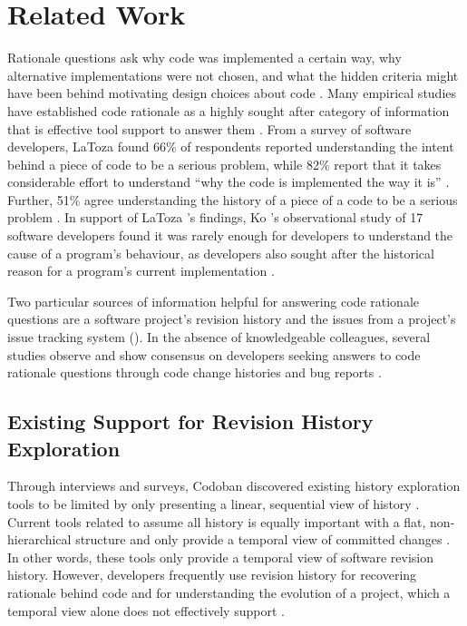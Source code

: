 \chapter{Related Work}
\label{ch:Related-Work}

Rationale questions ask why code was implemented a certain way, why alternative implementations were not chosen, and what the hidden criteria might have been behind motivating design choices about code \cite{latoza_hard-answer_2010}.
Many empirical studies have established code rationale as a highly sought after category of information that is effective tool support to answer them \cite{latoza_maintaining_2006, latoza_hard-answer_2010, ko_information_2007}. 
From a survey of software developers, LaToza \etal found 66\% of respondents reported understanding the intent behind a piece of code to be a serious problem, 
while 82\% report that it takes considerable effort to understand ``why the code is implemented the way it is'' \cite{latoza_maintaining_2006}.
Further, 51\% agree understanding the history of a piece of a code to be a serious problem \cite{latoza_maintaining_2006}.
In support of LaToza \etal's findings, Ko \etal's observational study of 17 software developers found it was rarely enough for developers to understand the cause of a program's behaviour, as developers also sought after the historical reason for a program's current implementation \cite{ko_information_2007}.

Two particular sources of information helpful for answering code rationale questions are a software project's revision history and the issues from a project's issue tracking system (). 
In the absence of knowledgeable colleagues, several studies observe and show consensus on developers seeking answers to code rationale questions through code change histories and bug reports \cite{ko_information_2007, codoban_software_2015, robillard_turnover-induced_2021}.

\section{Existing Support for Revision History Exploration}

Through interviews and surveys, Codoban \etal discovered existing history exploration tools to be limited by only presenting a linear, sequential view of history \cite{codoban_software_2015}.
Current tools related to  assume all history is equally important with a flat, non-hierarchical structure and only provide a temporal view of committed changes \cite{codoban_software_2015}.
In other words, these tools only provide a temporal view of software revision history.
However, developers frequently use revision history for recovering rationale behind code and for understanding the evolution of a project, which a temporal view alone does not effectively support \cite{codoban_software_2015}.

